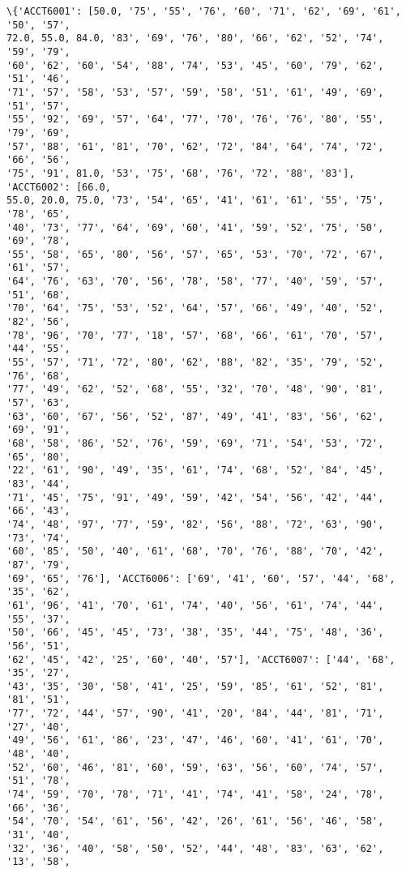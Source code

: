 \documentclass[11pt]{article}
\begin{document}
    \begin{Verbatim}[commandchars=\\\{\}]
\{'ACCT6001': [50.0, '75', '55', '76', '60', '71', '62', '69', '61', '50', '57',
72.0, 55.0, 84.0, '83', '69', '76', '80', '66', '62', '52', '74', '59', '79',
'60', '62', '60', '54', '88', '74', '53', '45', '60', '79', '62', '51', '46',
'71', '57', '58', '53', '57', '59', '58', '51', '61', '49', '69', '51', '57',
'55', '92', '69', '57', '64', '77', '70', '76', '76', '80', '55', '79', '69',
'57', '88', '61', '81', '70', '62', '72', '84', '64', '74', '72', '66', '56',
'75', '91', 81.0, '53', '75', '68', '76', '72', '88', '83'], 'ACCT6002': [66.0,
55.0, 20.0, 75.0, '73', '54', '65', '41', '61', '61', '55', '75', '78', '65',
'40', '73', '77', '64', '69', '60', '41', '59', '52', '75', '50', '69', '78',
'55', '58', '65', '80', '56', '57', '65', '53', '70', '72', '67', '61', '57',
'64', '76', '63', '70', '56', '78', '58', '77', '40', '59', '57', '51', '68',
'70', '64', '75', '53', '52', '64', '57', '66', '49', '40', '52', '82', '56',
'78', '96', '70', '77', '18', '57', '68', '66', '61', '70', '57', '44', '55',
'55', '57', '71', '72', '80', '62', '88', '82', '35', '79', '52', '76', '68',
'77', '49', '62', '52', '68', '55', '32', '70', '48', '90', '81', '57', '63',
'63', '60', '67', '56', '52', '87', '49', '41', '83', '56', '62', '69', '91',
'68', '58', '86', '52', '76', '59', '69', '71', '54', '53', '72', '65', '80',
'22', '61', '90', '49', '35', '61', '74', '68', '52', '84', '45', '83', '44',
'71', '45', '75', '91', '49', '59', '42', '54', '56', '42', '44', '66', '43',
'74', '48', '97', '77', '59', '82', '56', '88', '72', '63', '90', '73', '74',
'60', '85', '50', '40', '61', '68', '70', '76', '88', '70', '42', '87', '79',
'69', '65', '76'], 'ACCT6006': ['69', '41', '60', '57', '44', '68', '35', '62',
'61', '96', '41', '70', '61', '74', '40', '56', '61', '74', '44', '55', '37',
'50', '66', '45', '45', '73', '38', '35', '44', '75', '48', '36', '56', '51',
'62', '45', '42', '25', '60', '40', '57'], 'ACCT6007': ['44', '68', '35', '27',
'43', '35', '30', '58', '41', '25', '59', '85', '61', '52', '81', '81', '51',
'77', '72', '44', '57', '90', '41', '20', '84', '44', '81', '71', '27', '40',
'49', '56', '61', '86', '23', '47', '46', '60', '41', '61', '70', '48', '40',
'52', '60', '46', '81', '60', '59', '63', '56', '60', '74', '57', '51', '78',
'74', '59', '70', '78', '71', '41', '74', '41', '58', '24', '78', '66', '36',
'54', '70', '54', '61', '56', '42', '26', '61', '56', '46', '58', '31', '40',
'32', '36', '40', '58', '50', '52', '44', '48', '83', '63', '62', '13', '58',

\end{Verbatim}
\end{document}
